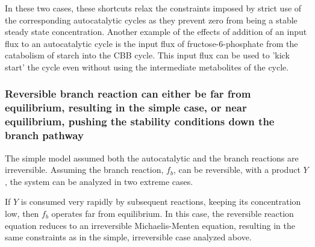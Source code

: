     \iftoggle{elifesubmission} {
  Interestingly, we find that in the two autocatalytic cycles shown in Figure \ref{fig:realautocatal}-figure supplements 1 and 2, reactions that generate direct input flux into the cycle exist.
  In the ribose-5P assimilating autocatalytic cycle (Figure \ref{fig:realautocatal}-figure supplement 1), the rpi reaction serves as a shortcut, allowing input flux directly from ribose-5P into the cycle.
  In the glycerone-phosphate assimilating cycle (Figure \ref{fig:realautocatal}-figure supplement 2), the tpi reaction similarly serves as such a shortcut.} {
  Interestingly, we find that in the two autocatalytic cycles shown in figures \ref{fig:extrasamps1} and \ref{fig:extrasamps2}, reactions that generate direct input flux into the cycle exist.
  In the ribose-5P assimilating autocatalytic cycle (Figure \ref{fig:extrasamps1}), the rpi reaction serves as a shortcut, allowing input flux directly from ribose-5P into the cycle.
  In the glycerone-phosphate assimilating cycle (Figure \ref{fig:extrasamps2}), the tpi reaction similarly serves as such a shortcut.}
  In these two cases, these shortcuts relax the constraints imposed by strict use of the corresponding autocatalytic cycles as they prevent zero from being a stable steady state concentration.
    Another example of the effects of addition of an input flux to an autocatalytic cycle is the input flux of fructose-6-phosphate from the catabolism of starch into the CBB cycle.
    This input flux can be used to 'kick start' the cycle even without using the intermediate metabolites of the cycle.


    \subsubsection{Reversible branch reaction can either be far from equilibrium, resulting in the simple case, or near equilibrium, pushing the stability conditions down the branch pathway}
    The simple model assumed both the autocatalytic and the branch reactions are irreversible.
    Assuming the branch reaction, $f_b$, can be reversible, with a product $Y$, the system can be analyzed in two extreme cases.

    If $Y$ is consumed very rapidly by subsequent reactions, keeping its concentration low, then $f_b$ operates far from equilibrium.
    In this case, the reversible reaction equation reduces to an irreversible Michaelis-Menten equation, resulting in the same constraints as in the simple, irreversible case analyzed above.

